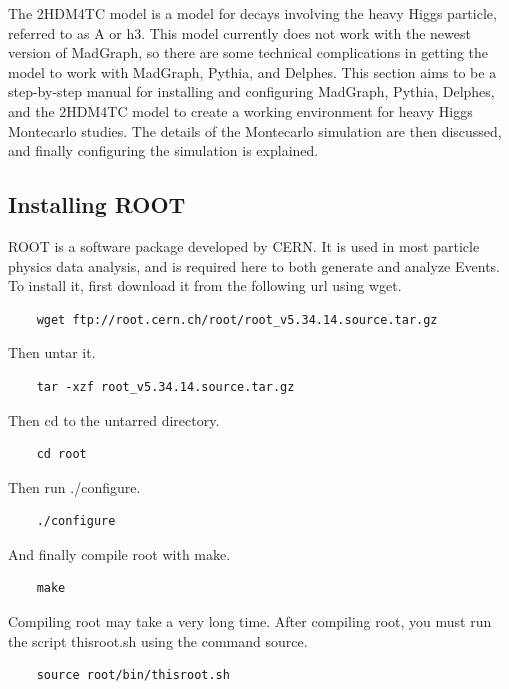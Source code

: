 \documentclass{article}
\begin{document}
The 2HDM4TC model is a model for decays involving the heavy Higgs particle, referred to as A or h3. This model currently does not work with the newest version of MadGraph, so there are some technical complications in getting the model to work with MadGraph, Pythia, and Delphes. This section aims to be a step-by-step manual for installing and configuring MadGraph, Pythia, Delphes, and the 2HDM4TC model to create a working environment for heavy Higgs Montecarlo studies. The details of the Montecarlo simulation are then discussed, and finally configuring the simulation is explained.

\subsection{Installing ROOT}

ROOT is a software package developed by CERN. It is used in most particle physics data analysis, and is required here to both generate and analyze Events. To install it, first download it from the following url using wget.

\begin{verbatim}
	wget ftp://root.cern.ch/root/root_v5.34.14.source.tar.gz
\end{verbatim}

Then untar it.

\begin{verbatim}
	tar -xzf root_v5.34.14.source.tar.gz
\end{verbatim}

Then cd to the untarred directory.

\begin{verbatim}
	cd root
\end{verbatim}

Then run ./configure.

\begin{verbatim}
	./configure
\end{verbatim}

And finally compile root with make.

\begin{verbatim}
	make
\end{verbatim}

Compiling root may take a very long time. After compiling root, you must run the script thisroot.sh using the command source.

\begin{verbatim}
	source root/bin/thisroot.sh
\end{verbatim}
\end{document}
